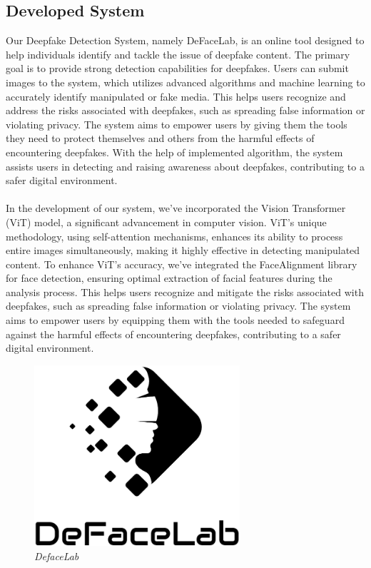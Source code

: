 \subsection{Developed System}

Our Deepfake Detection System, namely DeFaceLab, is an online tool designed to help individuals identify and tackle the issue of deepfake content. The primary goal is to provide strong detection capabilities for deepfakes. Users can submit images to the system, which utilizes advanced algorithms and machine learning to accurately identify manipulated or fake media. This helps users recognize and address the risks associated with deepfakes, such as spreading false information or violating privacy. The system aims to empower users by giving them the tools they need to protect themselves and others from the harmful effects of encountering deepfakes. With the help of implemented algorithm, the system assists users in detecting and raising awareness about deepfakes, contributing to a safer digital environment.\\
\\
In the development of our system, we've incorporated the Vision Transformer (ViT) model, a significant advancement in computer vision. ViT's unique methodology, using self-attention mechanisms, enhances its ability to process entire images simultaneously, making it highly effective in detecting manipulated content. To enhance ViT's accuracy, we've integrated the FaceAlignment library for face detection, ensuring optimal extraction of facial features during the analysis process. This helps users recognize and mitigate the risks associated with deepfakes, such as spreading false information or violating privacy. The system aims to empower users by equipping them with the tools needed to safeguard against the harmful effects of encountering deepfakes, contributing to a safer digital environment.
\begin{figure}[h]
    \centering
    \includegraphics[width= 3in ]{img/logoblack.png}
    \caption{\textit{DefaceLab}}
\end{figure}